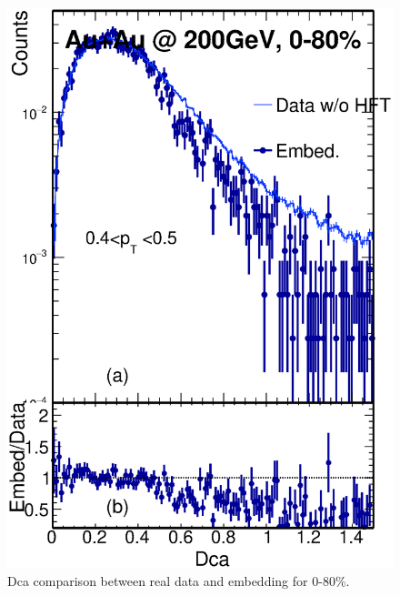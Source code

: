 \begin{figure}[htbp]
\begin{minipage}[htbp]{0.45\linewidth}
\includegraphics[width=1.0\textwidth,angle=0]{figure/Run14_D0HFT/Dca11_2.eps} 
\caption{ Dca comparison between real data and embedding for 0-80\%. \label{Dca_0_80_2}}
\end{minipage}
\end{figure}

